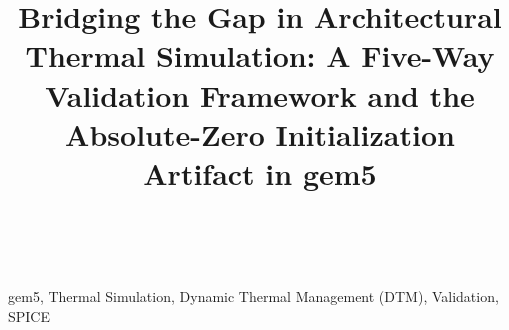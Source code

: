 \documentclass[journal, 10pt, twocolumn]{IEEEtran}
\begin{document}
\title{Bridging the Gap in Architectural Thermal Simulation: A Five-Way Validation Framework and the Absolute-Zero Initialization Artifact in gem5}

\author{
     \\
}

\maketitle



\begin{IEEEkeywords}
gem5, Thermal Simulation, Dynamic Thermal Management (DTM), Validation, SPICE
\end{IEEEkeywords}








\end{document}
